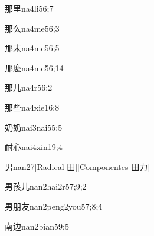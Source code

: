 \begin{verbete}{那里}{na4li5}{6;7}
\end{verbete}

\begin{verbete}{那么}{na4me5}{6;3}
\end{verbete}

\begin{verbete}{那末}{na4me5}{6;5}
\end{verbete}

\begin{verbete}{那麽}{na4me5}{6;14}
\end{verbete}

\begin{verbete}{那儿}{na4r5}{6;2}
\end{verbete}

\begin{verbete}{那些}{na4xie1}{6;8}
\end{verbete}

\begin{verbete}{奶奶}{nai3nai5}{5;5}
\end{verbete}

\begin{verbete}{耐心}{nai4xin1}{9;4}
\end{verbete}

\begin{verbete}{男}{nan2}{7}[Radical 田][Componentes 田力]
\end{verbete}

\begin{verbete}{男孩儿}{nan2hai2r5}{7;9;2}
\end{verbete}

\begin{verbete}{男朋友}{nan2peng2you5}{7;8;4}
\end{verbete}

\begin{verbete}{南边}{nan2bian5}{9;5}
\end{verbete}

